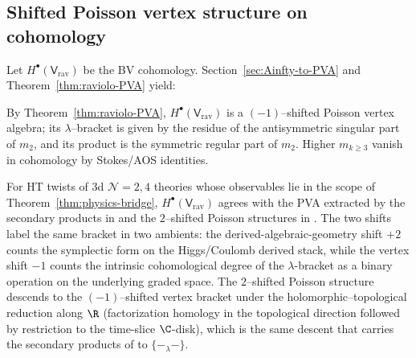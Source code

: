 \subsection{Shifted Poisson vertex structure on cohomology}
\label{subsec:PVA-cohomology-expanded}
Let $H^\bullet(\mathsf V_{\mathrm{rav}})$ be the BV cohomology. Section~\ref{sec:Ainfty-to-PVA} and Theorem~\ref{thm:raviolo-PVA} yield:

\begin{theorem}
\label{thm:raviolo-PVA-expanded}
By Theorem~\ref{thm:raviolo-PVA},
$H^\bullet(\mathsf V_{\mathrm{rav}})$ is a $(-1)$–shifted Poisson vertex algebra; its $\lambda$–bracket is given by the residue of the antisymmetric singular part of $m_2$, and its product is the symmetric regular part of $m_2$. Higher $m_{k\ge3}$ vanish in cohomology by Stokes/AOS identities.
\end{theorem}

\begin{corollary}
\label{cor:agreement-HT}
For HT twists of 3d $\mathcal N=2,4$ theories whose observables lie in the scope of Theorem~\ref{thm:physics-bridge}, $H^\bullet(\mathsf V_{\mathrm{rav}})$ agrees with the PVA extracted by the secondary products in \cite{OY20,CDG20} and the $2$--shifted Poisson structures in \cite{GW23,GRW21}. The two shifts label the same bracket in two ambients: the derived-algebraic-geometry shift $+2$ counts the symplectic form on the Higgs/Coulomb derived stack, while the vertex shift $-1$ counts the intrinsic cohomological degree of the $\lambda$-bracket as a binary operation on the underlying graded space. The $2$--shifted Poisson structure descends to the $(-1)$--shifted vertex bracket under the holomorphic--topological reduction along $\R$ (factorization homology in the topological direction followed by restriction to the time-slice $\C$-disk), which is the same descent that carries the secondary products of \cite{OY20,CDG20} to $\{-_\lambda-\}$.
\end{corollary}


